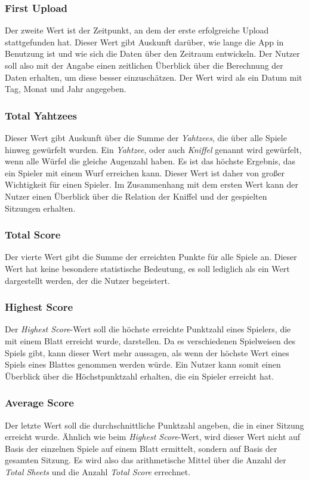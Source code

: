 \subsubsection{First Upload}
Der zweite Wert ist der Zeitpunkt, an dem der erste erfolgreiche Upload stattgefunden hat. Dieser Wert gibt Auskunft darüber, wie lange die App in Benutzung ist und wie sich die Daten über den Zeitraum entwickeln. Der Nutzer soll also mit der Angabe einen zeitlichen Überblick über die Berechnung der Daten erhalten, um diese besser einzuschätzen. Der Wert wird als ein Datum mit Tag, Monat und Jahr angegeben.

\subsubsection{Total Yahtzees}
Dieser Wert gibt Auskunft über die Summe der \textit{Yahtzees}, die über alle Spiele hinweg gewürfelt wurden. Ein \textit{Yahtzee}, oder auch \textit{Kniffel} genannt wird gewürfelt, wenn alle Würfel die gleiche Augenzahl haben. Es ist das höchste Ergebnis, das ein Spieler mit einem Wurf erreichen kann. Dieser Wert ist daher von großer Wichtigkeit für einen Spieler. Im Zusammenhang mit dem ersten Wert kann der Nutzer einen Überblick über die Relation der Kniffel und der gespielten Sitzungen erhalten.

\subsubsection{Total Score}
Der vierte Wert gibt die Summe der erreichten Punkte für alle Spiele an. Dieser Wert hat keine besondere statistische Bedeutung, es soll lediglich als ein Wert dargestellt werden, der die Nutzer begeistert.

\subsubsection{Highest Score}
Der \textit{Highest Score}-Wert soll die höchste erreichte Punktzahl eines Spielers, die mit einem Blatt erreicht wurde, darstellen. Da es verschiedenen Spielweisen des Spiels gibt, kann dieser Wert mehr aussagen, als wenn der höchste Wert eines Spiels eines Blattes genommen werden würde. Ein Nutzer kann somit einen Überblick über die Höchstpunktzahl erhalten, die ein Spieler erreicht hat.

\subsubsection{Average Score}
Der letzte Wert soll die durchschnittliche Punktzahl angeben, die in einer Sitzung erreicht wurde. Ähnlich wie beim \textit{Highest Score}-Wert, wird dieser Wert nicht auf Basis der einzelnen Spiele auf einem Blatt ermittelt, sondern auf Basis der gesamten Sitzung. Es wird also das arithmetische Mittel über die Anzahl der \textit{Total Sheets} und die Anzahl \textit{Total Score} errechnet.

